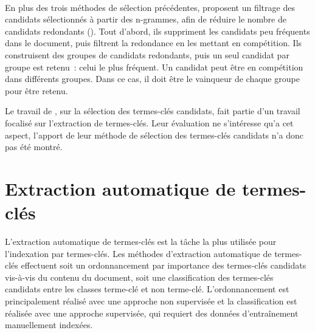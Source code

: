     \begin{example}\label{ex:na+}
    \end{example}

    ~\\En plus des trois méthodes de sélection précédentes,
     proposent un filtrage
    des candidats sélectionnés à partir des n-grammes, afin de réduire le nombre
    de candidats redondants (). Tout d'abord, ils suppriment les
    candidats peu fréquents dans le document, puis filtrent la redondance en les
    mettant en compétition. Ils construisent des groupes de candidats
    redondants, puis un seul candidat par groupe est retenu~: celui le plus
    fréquent. Un candidat peut être en compétition dans différents groupes. Dans
    ce cas, il doit être le \og{}vainqueur\fg{} de chaque groupe pour être
    retenu.

    Le travail de , sur la
    sélection des termes-clés candidats, fait partie d'un travail focalisé sur
    l'extraction de termes-clés. Leur évaluation ne s'intéresse qu'a cet aspect,
    l'apport de leur méthode de sélection des termes-clés candidats n'a donc pas
    été montré.


  \section{Extraction automatique de termes-clés}
  \label{sec:main-state_of_the_art-automatic_keyphrase_extraction}
    L'extraction automatique de termes-clés est la tâche la plus utilisée pour
    l'indexation par termes-clés. Les méthodes d'extraction automatique de
    termes-clés effectuent soit un ordonnancement par importance des termes-clés
    candidats vis-à-vis du contenu du document, soit une classification des
    termes-clés candidats entre les classes \og{}terme-clé\fg{} et \og{}non
    terme-clé\fg{}. L'ordonnancement est principalement réalisé avec une
    approche non supervisée et la classification est réalisée avec une approche
    supervisée, qui requiert des données d'entraînement manuellement indexées.

